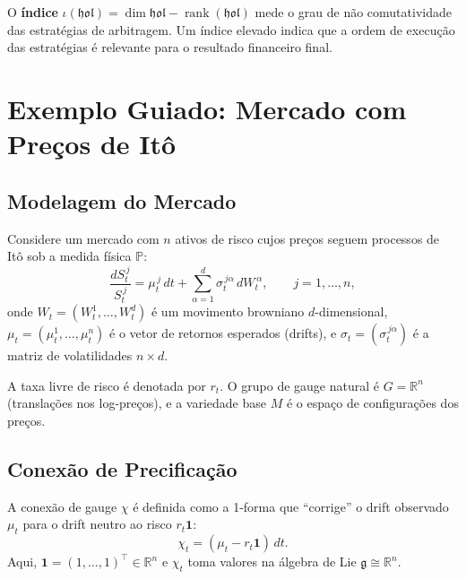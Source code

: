 \begin{prop}
O \textbf{\'indice} \(\iota(\mathfrak{hol}) = \dim \mathfrak{hol} - \operatorname{rank}(\mathfrak{hol})\) mede o grau de n\~ao comutatividade das estrat\'egias de arbitragem. Um \'indice elevado indica que a ordem de execu\c{c}\~ao das estrat\'egias \'e relevante para o resultado financeiro final.
\end{prop}

\section{Exemplo Guiado: Mercado com Pre\c{c}os de It\^o}

\subsection{Modelagem do Mercado}

Considere um mercado com \(n\) ativos de risco cujos pre\c{c}os seguem processos de It\^o sob a medida f\'isica \(\mathbb{P}\):
\begin{equation}\label{eq:ito-prices}
 \frac{dS_t^{\,j}}{S_t^{\,j}} = \mu_t^{\,j} \, dt + \sum_{\alpha=1}^{d} \sigma_t^{\,j\alpha} \, dW_t^{\,\alpha}, \qquad j = 1, \dots, n,
\end{equation}
onde \(W_t = (W_t^1, \dots, W_t^d)\) \'e um movimento browniano \(d\)-dimensional, \(\mu_t = (\mu_t^1, \dots, \mu_t^n)\) \'e o vetor de retornos esperados (drifts), e \(\sigma_t = (\sigma_t^{\,j\alpha})\) \'e a matriz de volatilidades \(n \times d\).

A taxa livre de risco \'e denotada por \(r_t\). O grupo de gauge natural \'e \(G = \mathbb{R}^n\) (transla\c{c}\~oes nos log-pre\c{c}os), e a variedade base \(M\) \'e o espa\c{c}o de configura\c{c}\~oes dos pre\c{c}os.

\subsection{Conex\~ao de Precifica\c{c}\~ao}

A conex\~ao de gauge \(\chi\) \'e definida como a 1-forma que ``corrige'' o drift observado \(\mu_t\) para o drift neutro ao risco \(r_t \mathbf{1}\):
\begin{equation}\label{eq:pricing-connection}
 \chi_t = (\mu_t - r_t \mathbf{1}) \, dt.
\end{equation}
Aqui, \(\mathbf{1} = (1, \dots, 1)^\top \in \mathbb{R}^n\) e \(\chi_t\) toma valores na \'algebra de Lie \(\mathfrak{g} \cong \mathbb{R}^n\).

